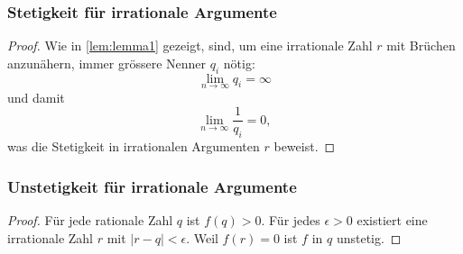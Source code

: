 \subsubsection{Stetigkeit für irrationale Argumente}
\begin{proof}
Wie in \autoref{lem:lemma1} gezeigt, sind,
um eine irrationale Zahl $r$ mit Brüchen
anzunähern, immer grössere Nenner $q_i$ nötig:
\[
	\lim_{n\to \infty} q_i = \infty
\]
und damit
\[
	\lim_{n \to \infty} \frac{1}{q_i} = 0,
\] 
was die Stetigkeit in irrationalen Argumenten $r$ beweist.
\end{proof}

\subsubsection{Unstetigkeit für irrationale Argumente}
\begin{proof}
Für jede rationale Zahl $q$ ist $f(q)>0$. 
Für jedes $\epsilon>0$ existiert 
eine irrationale Zahl $r$ mit $|r-q|<\epsilon$.
Weil $f(r)=0$ ist $f$ in $q$ unstetig.
\end{proof}

